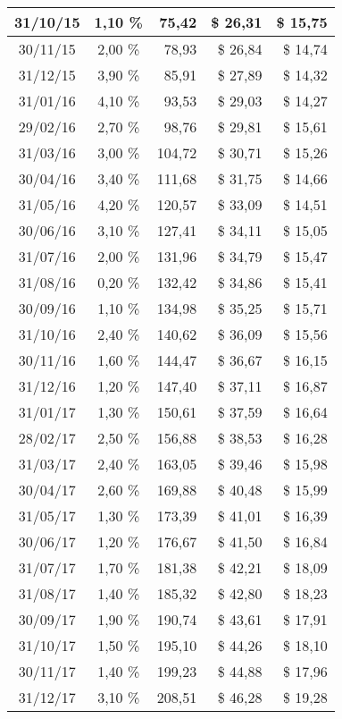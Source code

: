 \begin{longtable}{|c|c|r|r|r|}
31/10/15 & 1,10 \% & 75,42 & \$ 26,31 & \$ 15,75 \\ \hline
30/11/15 & 2,00 \% & 78,93 & \$ 26,84 & \$ 14,74 \\ \hline
31/12/15 & 3,90 \% & 85,91 & \$ 27,89 & \$ 14,32 \\ \hline
31/01/16 & 4,10 \% & 93,53 & \$ 29,03 & \$ 14,27 \\ \hline
29/02/16 & 2,70 \% & 98,76 & \$ 29,81 & \$ 15,61 \\ \hline
31/03/16 & 3,00 \% & 104,72 & \$ 30,71 & \$ 15,26 \\ \hline
30/04/16 & 3,40 \% & 111,68 & \$ 31,75 & \$ 14,66 \\ \hline
31/05/16 & 4,20 \% & 120,57 & \$ 33,09 & \$ 14,51 \\ \hline
30/06/16 & 3,10 \% & 127,41 & \$ 34,11 & \$ 15,05 \\ \hline
31/07/16 & 2,00 \% & 131,96 & \$ 34,79 & \$ 15,47 \\ \hline
31/08/16 & 0,20 \% & 132,42 & \$ 34,86 & \$ 15,41 \\ \hline
30/09/16 & 1,10 \% & 134,98 & \$ 35,25 & \$ 15,71 \\ \hline
31/10/16 & 2,40 \% & 140,62 & \$ 36,09 & \$ 15,56 \\ \hline
30/11/16 & 1,60 \% & 144,47 & \$ 36,67 & \$ 16,15 \\ \hline
31/12/16 & 1,20 \% & 147,40 & \$ 37,11 & \$ 16,87 \\ \hline
31/01/17 & 1,30 \% & 150,61 & \$ 37,59 & \$ 16,64 \\ \hline
28/02/17 & 2,50 \% & 156,88 & \$ 38,53 & \$ 16,28 \\ \hline
31/03/17 & 2,40 \% & 163,05 & \$ 39,46 & \$ 15,98 \\ \hline
30/04/17 & 2,60 \% & 169,88 & \$ 40,48 & \$ 15,99 \\ \hline
31/05/17 & 1,30 \% & 173,39 & \$ 41,01 & \$ 16,39 \\ \hline
30/06/17 & 1,20 \% & 176,67 & \$ 41,50 & \$ 16,84 \\ \hline
31/07/17 & 1,70 \% & 181,38 & \$ 42,21 & \$ 18,09 \\ \hline
31/08/17 & 1,40 \% & 185,32 & \$ 42,80 & \$ 18,23 \\ \hline
30/09/17 & 1,90 \% & 190,74 & \$ 43,61 & \$ 17,91 \\ \hline
31/10/17 & 1,50 \% & 195,10 & \$ 44,26 & \$ 18,10 \\ \hline
30/11/17 & 1,40 \% & 199,23 & \$ 44,88 & \$ 17,96 \\ \hline
31/12/17 & 3,10 \% & 208,51 & \$ 46,28 & \$ 19,28 \\ \hline

\end{longtable}
